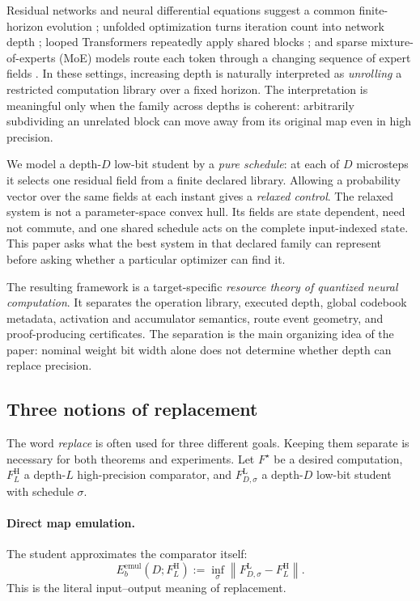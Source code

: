 \documentclass[twoside,11pt]{article}
\newcommand{\norm}[1]{\left\lVert #1\right\rVert}
\begin{document}
Residual networks and neural differential equations suggest a common
finite-horizon evolution \citep{HeEtAl2016,ChenRubanovaBettencourtDuvenaud2018,HaberRuthotto2018};
unfolded optimization turns iteration count into network depth
\citep{GregorLeCun2010,ChenLiuWangYin2018,MongaLiEldar2021}; looped
Transformers repeatedly apply shared blocks \citep{FangEtAl2026LoopQ}; and
sparse mixture-of-experts (MoE) models route each token through a changing
sequence of expert fields \citep{ShazeerEtAl2017,FedusZophShazeer2022}.  In
these settings, increasing depth is naturally interpreted as \emph{unrolling}
a restricted computation library over a fixed horizon.  The interpretation is
meaningful only when the family across depths is coherent: arbitrarily
subdividing an unrelated block can move away from its original map even in
high precision.

We model a depth-$D$ low-bit student by a \emph{pure schedule}: at each of $D$
microsteps it selects one residual field from a finite declared library.
Allowing a probability vector over the same fields at each instant gives a
\emph{relaxed control}.  The relaxed system is not a parameter-space convex
hull.  Its fields are state dependent, need not commute, and one shared
schedule acts on the complete input-indexed state.  This paper asks what the
best system in that declared family can represent before asking whether a
particular optimizer can find it.

The resulting framework is a target-specific \emph{resource theory of
quantized neural computation}.  It separates the operation library, executed
depth, global codebook metadata, activation and accumulator semantics, route
event geometry, and proof-producing certificates.  The separation is the main
organizing idea of the paper: nominal weight bit width alone does not determine
whether depth can replace precision.

\subsection{Three notions of replacement}
\label{sec:replacement-notions}

The word \emph{replace} is often used for three different goals.  Keeping them
separate is necessary for both theorems and experiments.  Let $F^\star$ be a
desired computation, $F_L^{\mathrm H}$ a depth-$L$ high-precision comparator,
and $F_{D,\sigma}^{\mathrm L}$ a depth-$D$ low-bit student with schedule
$\sigma$.

\paragraph{Direct map emulation.}
The student approximates the comparator itself:
\begin{equation}
 E_b^{\mathrm{emul}}(D;F_L^{\mathrm H})
 :=\inf_\sigma \norm{F_{D,\sigma}^{\mathrm L}-F_L^{\mathrm H}}.
 \label{eq:direct-emulation-intro}
\end{equation}
This is the literal input--output meaning of replacement.
\end{document}
